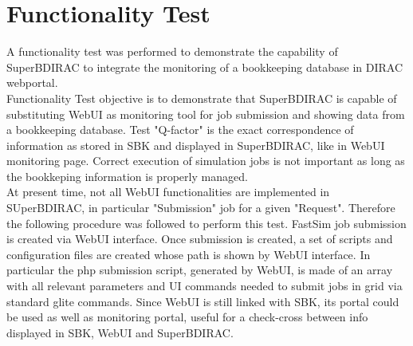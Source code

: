 \documentclass[a4paper]{jpconf}
\begin{document}
\section{Functionality Test}
\label{sec:test}
A functionality test was performed to demonstrate the capability of SuperBDIRAC to integrate the monitoring of a bookkeeping database in DIRAC webportal.\\
Functionality Test objective is to demonstrate that SuperBDIRAC is capable of substituting WebUI as monitoring tool for job submission and showing data from a bookkeeping database. Test "Q-factor" is the exact correspondence of information as stored in SBK and displayed in SuperBDIRAC, like in WebUI monitoring page. Correct execution of simulation jobs is not important as long as the bookkeping information is properly managed.\\
At present time, not all WebUI functionalities are implemented in SUperBDIRAC, in particular "Submission" job for a given "Request".
Therefore the following procedure was followed to perform this test. FastSim job submission is created via WebUI interface. Once submission is created, a set of scripts and configuration files are created whose path is shown by WebUI interface. In particular the php submission script, generated by WebUI, is made of an array with all relevant parameters and UI commands needed to submit jobs in grid via standard glite commands.
Since WebUI is still linked with SBK, its portal could be used as well as monitoring portal, useful for a check-cross between info displayed in SBK, WebUI and SuperBDIRAC.\\
\end{document}
